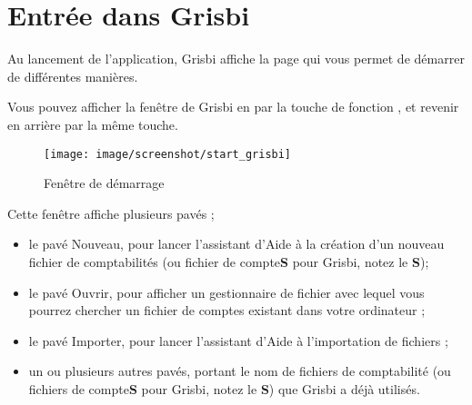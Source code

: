 
\chapter{Entrée dans Grisbi\label{entrance}}



Au lancement de l'application, Grisbi affiche la page
qui vous permet de démarrer de différentes manières.



Vous pouvez afficher la fenêtre de Grisbi en  par la touche de fonction , et revenir en arrière par la même touche.


\begin{figure}[htbp]			%
\begin{center}					%
\texttt{[image: image/screenshot/start\_grisbi]}		%
\end{center}
\caption{Fenêtre de démarrage}			%
\label{start_grisbi}				%
\end{figure}


Cette fenêtre affiche plusieurs pavés ;

\begin{itemize}
	 \item le pavé Nouveau, pour lancer l'assistant d'Aide à la création d'un nouveau fichier de comptabilités (ou fichier de compte\textbf{S} pour Grisbi, notez le \textbf{S});
	 \item le pavé Ouvrir, pour afficher un gestionnaire de fichier avec lequel vous pourrez chercher un fichier de comptes existant dans votre ordinateur ;
	 \item le pavé Importer, pour lancer l'assistant d'Aide à l'importation de fichiers ;
	 \item un ou plusieurs autres pavés, portant le nom de fichiers de comptabilité (ou fichiers de compte\textbf{S} pour Grisbi, notez le \textbf{S}) que Grisbi a déjà utilisés.
\end{itemize}

